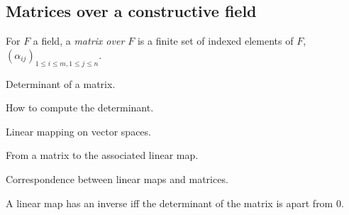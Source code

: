 \subsection*{Matrices over a constructive field}

\begin{definition} For $F$ a field, a {\em matrix over $F$\/} is a
finite set of indexed elements of $F$, $(\alpha_{ij})_{1\leq i\leq m,
1\leq j\leq n}$.
\end{definition}


\begin{definition} Determinant of a matrix.
\end{definition}

\begin{lemma}
  How to compute the determinant.
\end{lemma}

\begin{definition}
  Linear mapping on vector spaces.
\end{definition}

\begin{definition}
  From a matrix to the associated linear map.  
\end{definition}

\begin{lemma}
  Correspondence between linear maps and matrices.
\end{lemma}

\begin{proposition}\label{lemLinInvDet}
  A linear map has an inverse iff the determinant of the matrix is
  apart from $0$.
\end{proposition}

